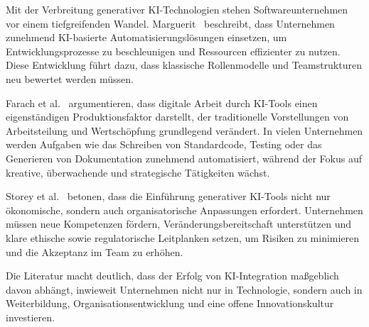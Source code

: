 Mit der Verbreitung generativer KI-Technologien stehen Softwareunternehmen vor
einem tiefgreifenden Wandel. Marguerit~\cite{marguerit_augmenting_2025}
beschreibt, dass Unternehmen zunehmend KI-basierte Automatisierungslösungen
einsetzen, um Entwicklungsprozesse zu beschleunigen und Ressourcen effizienter
zu nutzen. Diese Entwicklung führt dazu, dass klassische Rollenmodelle und
Teamstrukturen neu bewertet werden müssen.

Farach et al.~\cite{farach_evolving_2025} argumentieren, dass digitale Arbeit
durch KI-Tools einen eigenständigen Produktionsfaktor darstellt, der
traditionelle Vorstellungen von Arbeitsteilung und Wertschöpfung grundlegend
verändert. In vielen Unternehmen werden Aufgaben wie das Schreiben von
Standardcode, Testing oder das Generieren von Dokumentation zunehmend
automatisiert, während der Fokus auf kreative, überwachende und strategische
Tätigkeiten wächst.

Storey et al.~\cite{storey_generative_2025} betonen, dass die Einführung
generativer KI-Tools nicht nur ökonomische, sondern auch organisatorische
Anpassungen erfordert. Unternehmen müssen neue Kompetenzen fördern,
Veränderungsbereitschaft unterstützen und klare ethische sowie regulatorische
Leitplanken setzen, um Risiken zu minimieren und die Akzeptanz im Team zu
erhöhen.

Die Literatur macht deutlich, dass der Erfolg von KI-Integration maßgeblich
davon abhängt, inwieweit Unternehmen nicht nur in Technologie, sondern auch in
Weiterbildung, Organisationsentwicklung und eine offene Innovationskultur
investieren.


